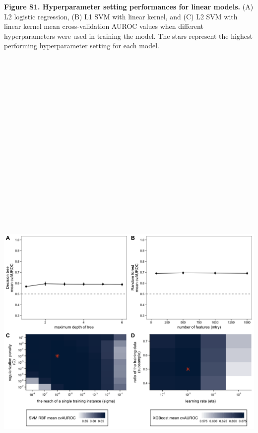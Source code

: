 \documentclass[11pt,]{article}
\begin{document}
\textbf{Figure S1. Hyperparameter setting performances for linear
models.} (A) L2 logistic regression, (B) L1 SVM with linear kernel, and
(C) L2 SVM with linear kernel mean cross-validation AUROC values when
different hyperparameters were used in training the model. The stars
represent the highest performing hyperparameter setting for each model.

\newpage

\includegraphics[height=30cm, width=15cm]{Figure_S2.png}
\end{document}
